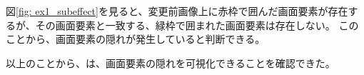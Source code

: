 
図\ref{fig: ex1_subeffect}を見ると、変更前画像上に赤枠で囲んだ画面要素が存在するが、その画面要素と一致する、緑枠で囲まれた画面要素は存在しない。
このことから、画面要素の隠れが発生していると判断できる。
\par
以上のことから、\toolName は、画面要素の隠れを可視化できることを確認できた。

